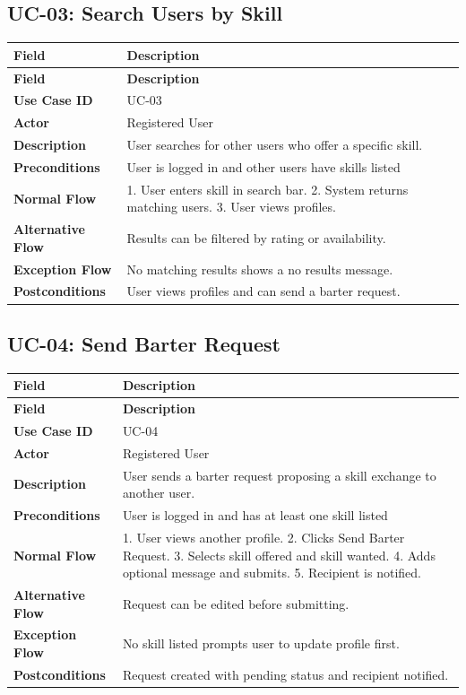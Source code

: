 \documentclass[12pt,a4paper]{article}
\begin{document}
\subsection*{UC-03: Search Users by Skill}
\begin{longtable}{>{\bfseries}L{3.5cm} L{10cm}}
\toprule
\textbf{Field} & \textbf{Description} \\ \midrule \endfirsthead \midrule \textbf{Field} & \textbf{Description} \\ \midrule \endhead \bottomrule \endfoot
Use Case ID      & UC-03 \\
Actor            & Registered User \\
Description      & User searches for other users who offer a specific skill. \\
Preconditions    & User is logged in and other users have skills listed \\
Normal Flow      & 1. User enters skill in search bar. 2. System returns matching users. 3. User views profiles. \\
Alternative Flow & Results can be filtered by rating or availability. \\
Exception Flow   & No matching results shows a no results message. \\
Postconditions   & User views profiles and can send a barter request. \\
\end{longtable}

\subsection*{UC-04: Send Barter Request}
\begin{longtable}{>{\bfseries}L{3.5cm} L{10cm}}
\toprule
\textbf{Field} & \textbf{Description} \\ \midrule \endfirsthead \midrule \textbf{Field} & \textbf{Description} \\ \midrule \endhead \bottomrule \endfoot
Use Case ID      & UC-04 \\
Actor            & Registered User \\
Description      & User sends a barter request proposing a skill exchange to another user. \\
Preconditions    & User is logged in and has at least one skill listed \\
Normal Flow      & 1. User views another profile. 2. Clicks Send Barter Request. 3. Selects skill offered and skill wanted. 4. Adds optional message and submits. 5. Recipient is notified. \\
Alternative Flow & Request can be edited before submitting. \\
Exception Flow   & No skill listed prompts user to update profile first. \\
Postconditions   & Request created with pending status and recipient notified. \\
\end{longtable}
\end{document}
